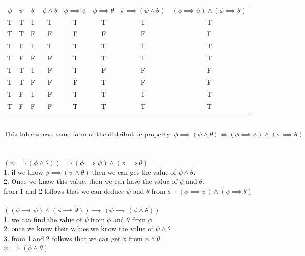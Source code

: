 \documentclass{article}
\begin{document}
\begin{tabular}{ c c c c c c c c }
  $\phi$ & $\psi$ & $\theta$ & $\psi \wedge \theta$ & $\phi \implies \psi$ & $\phi \implies \theta$ & $\phi \implies (\psi \wedge \theta)$ & $(\phi \implies \psi) \wedge (\phi \implies \theta)$\\
  T      & T      & T          & T          & T                           & T             & T & T                          \\
  T      & T      & F          & F          & F                           & F             & F & F                         \\
  T      & F      & T          & T          & T                           & T             & T & T                        \\
  T      & F      & F          & F          & T                           & T             & T & T                         \\
  T      & T      & T          & F          & T                           & F             & F & F                        \\
  T      & T      & F          & F          & F                           & T             & F & F                        \\
  T      & F      & T          & F          & T                           & T             & T & T                         \\
  T      & F      & F          & F          & T                           & T             & T & T                         \\
\end{tabular} \\
This table shows some form of the distributive property: $\phi \implies (\psi \wedge \theta) \Leftrightarrow (\phi \implies \psi) \wedge (\phi \implies \theta)$\\

\section{}
$(\psi \implies (\phi \wedge \theta)) \implies (\phi \implies \psi) \wedge (\phi \implies \theta)$\\
1. if we know $\phi \implies (\psi \wedge \theta)$ then we can get the value of $\psi \wedge \theta$.\\
2. Once we know this value, then we can have the value of $\psi$ and $\theta$.\\
from 1 and 2 follows that we can deduce $\psi$ and $\theta$ from $\phi$ - $(\phi \implies \psi) \wedge (\phi \implies \theta)$ \\
\\
$((\phi \implies \psi) \wedge (\phi \implies \theta)) \implies (\psi \implies (\phi \wedge \theta))$\\
1. we can find the value of $\psi$ from $\phi$ and $\theta$ from $\phi$ \\
2. once we know their values we know the value of $\psi \wedge \theta$ \\
3. from 1 and 2 follows that we can get $\phi$ from $\psi \wedge \theta$ \\
$\psi \implies (\phi \wedge \theta)$ \\
\end{document}
